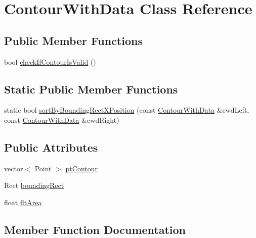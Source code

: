 \hypertarget{class_contour_with_data}{}\section{Contour\+With\+Data Class Reference}
\label{class_contour_with_data}
\subsection*{Public Member Functions}
\begin{DoxyCompactItemize}
\item 
bool \mbox{\hyperlink{class_contour_with_data_acb9ec1df19fe7a788d9570e6d9474924}{check\+If\+Contour\+Is\+Valid}} ()
\end{DoxyCompactItemize}
\subsection*{Static Public Member Functions}
\begin{DoxyCompactItemize}
\item 
static bool \mbox{\hyperlink{class_contour_with_data_a467efdd6adb42badb28de1398b269d1f}{sort\+By\+Bounding\+Rect\+X\+Position}} (const \mbox{\hyperlink{class_contour_with_data}{Contour\+With\+Data}} \&cwd\+Left, const \mbox{\hyperlink{class_contour_with_data}{Contour\+With\+Data}} \&cwd\+Right)
\end{DoxyCompactItemize}
\subsection*{Public Attributes}
\begin{DoxyCompactItemize}
\item 
vector$<$ Point $>$ \mbox{\hyperlink{class_contour_with_data_aeb3c5c0143088358af99fd02f02e9e59}{pt\+Contour}}
\item 
Rect \mbox{\hyperlink{class_contour_with_data_aaf5dd11cc4eb24d85df816d2e730b5f3}{bounding\+Rect}}
\item 
float \mbox{\hyperlink{class_contour_with_data_a640536a3a32dd02f85e6a5f70ddfe7e3}{flt\+Area}}
\end{DoxyCompactItemize}


\subsection{Member Function Documentation}
\mbox{\label{class_contour_with_data_acb9ec1df19fe7a788d9570e6d9474924}} 
